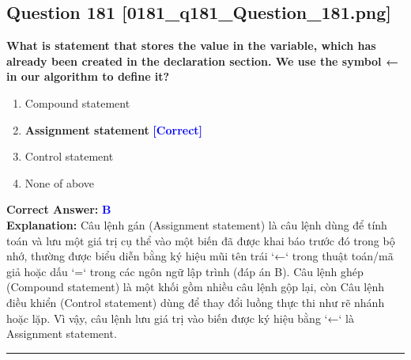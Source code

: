 \documentclass[11pt,a4paper]{article}
\begin{document}
\begin{minipage}{\textwidth}
\subsection*{Question 181 \quad \footnotesize{[0181\_q181\_Question\_181.png]}}
\noindent \textbf{What is statement that stores the value in the variable, which has already been created in the declaration section. We use the symbol ← in our algorithm to define it?}

\begin{enumerate}[label=\Alph*.]
    \item Compound statement
    \item \textbf{Assignment statement} \hfill \textcolor{blue}{\textbf{[Correct]}}
    \item Control statement
    \item None of above
\end{enumerate}

\noindent \textbf{Correct Answer:} \textcolor{blue}{\textbf{B}} \\[2pt]
\noindent \textbf{Explanation:} Câu lệnh gán (Assignment statement) là câu lệnh dùng để tính toán và lưu một giá trị cụ thể vào một biến đã được khai báo trước đó trong bộ nhớ, thường được biểu diễn bằng ký hiệu mũi tên trái `←` trong thuật toán/mã giả hoặc dấu `=` trong các ngôn ngữ lập trình (đáp án B). Câu lệnh ghép (Compound statement) là một khối gồm nhiều câu lệnh gộp lại, còn Câu lệnh điều khiển (Control statement) dùng để thay đổi luồng thực thi như rẽ nhánh hoặc lặp. Vì vậy, câu lệnh lưu giá trị vào biến được ký hiệu bằng `←` là Assignment statement.

\par\vspace{0.3cm}
\hrule
\vspace{0.3cm}
\end{minipage}
\end{document}
